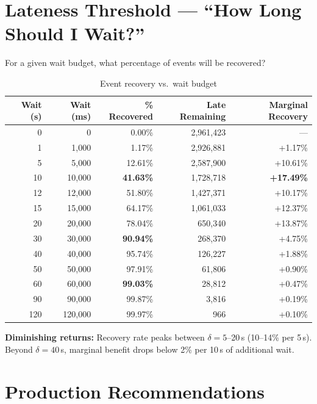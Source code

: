 \documentclass[11pt,a4paper]{article}
\begin{document}
\section{Lateness Threshold --- ``How Long Should I Wait?''}

For a given wait budget, what percentage of events will be recovered?

\begin{table}[H]
\centering
\caption{Event recovery vs.\ wait budget}
\label{tab:threshold}
\footnotesize
\begin{tabular}{rrrrr}
\toprule
\textbf{Wait (s)} & \textbf{Wait (ms)} & \textbf{\% Recovered} & \textbf{Late Remaining} & \textbf{Marginal Recovery} \\
\midrule
0  & 0       & 0.00\%  & 2,961,423 & --- \\
1  & 1,000   & 1.17\%  & 2,926,881 & +1.17\% \\
5  & 5,000   & 12.61\% & 2,587,900 & +10.61\% \\
10 & 10,000  & \textbf{41.63\%} & 1,728,718 & \textbf{+17.49\%} \\
12 & 12,000  & 51.80\% & 1,427,371 & +10.17\% \\
15 & 15,000  & 64.17\% & 1,061,033 & +12.37\% \\
20 & 20,000  & 78.04\% & 650,340   & +13.87\% \\
30 & 30,000  & \textbf{90.94\%} & 268,370   & +4.75\% \\
40 & 40,000  & 95.74\% & 126,227   & +1.88\% \\
50 & 50,000  & 97.91\% & 61,806    & +0.90\% \\
60 & 60,000  & \textbf{99.03\%} & 28,812    & +0.47\% \\
90 & 90,000  & 99.87\% & 3,816     & +0.19\% \\
120& 120,000 & 99.97\% & 966       & +0.10\% \\
\bottomrule
\end{tabular}
\end{table}

\textbf{Diminishing returns:} Recovery rate peaks between $\delta = 5$--20\,s (10--14\% per 5\,s).
Beyond $\delta = 40$\,s, marginal benefit drops below 2\% per 10\,s of additional wait.

\section{Production Recommendations}
\end{document}
